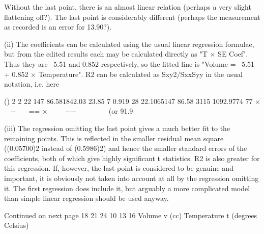 \documentclass[a4paper,12pt]{article}
\begin{document}
Without the last point, there is an almost linear relation (perhaps a very slight flattening off?).  The last point is considerably different (perhaps the measurement as recorded is an error for 13.90?). 
 
 
(ii) The coefficients can be calculated using the usual linear regression formulae, but from the edited results each may be calculated directly as "T × SE Coef".  Thus they are –5.51 and 0.852 respectively, so the fitted line is 
 "Volume  =  –5.51  +  0.852 × Temperature". 
 R2 can be calculated as Sxy2/SxxSyy in the usual notation, i.e. here 
 
()
2
2
22 147 86.581842.03 23.85 7 0.919 28 22.1065147 86.58 3115 1092.9774 77 ×  −  == ×    −−       (or 91.9%
 
 
(iii) The regression omitting the last point gives a much better fit to the remaining points.  This is reflected in the smaller residual mean square ((0.05700)2 instead of (0.5986)2) and hence the smaller standard errors of the coefficients, both of which give highly significant t statistics.  R2 is also greater for this regression.  If, however, the last point is considered to be genuine and important, it is obviously not taken into account at all by the regression omitting it.  The first regression does include it, but arguably a more complicated model than simple linear regression should be used anyway. 
 
Continued on next page 
18 21 24 
10
13
16
Volume v (cc)
Temperature t (degrees Celsius) 

 
 
\end{document}
